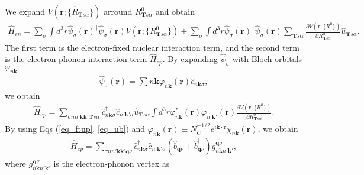 \documentclass{article}
\begin{document}
We expand $V(\textbf{r};\{\hat{R}_{\textbf{T}s\alpha}\})$ arround $R^0_{\textbf{T}s\alpha}$
and obtain
\begin{align}
    \hat{H}_{en} = \sum_{\sigma} \int d^3 r \hat{\psi}_{\sigma}(\textbf{r})^\dagger 
    \hat{\psi}_{\sigma}(\textbf{r}) V(\textbf{r};\{R^0_{\textbf{T}s\alpha}\})
    +
    \sum_{\sigma} \int d^3 r \hat{\psi}_{\sigma}(\textbf{r})^\dagger 
    \hat{\psi}_{\sigma}(\textbf{r}) \sum_{\textbf{T}s\alpha} 
    \frac{\partial V(\textbf{r};\{R^0\})}{\partial R^0_{\textbf{T}s\alpha}}
    \hat{u}_{\textbf{T}s\alpha}.
\end{align}
The first term is the electron-fixed nuclear interaction term, and the second term is the electron-phonon interaction term $\hat{H}_{ep}$.
By expanding $\hat{\psi}_{\sigma}$ with Bloch orbitals $\varphi_{n\textbf{k}}$
\begin{align}
    \hat{\psi}_{\sigma}(\textbf{r}) = \sum{n\textbf{k}}\varphi_{n\textbf{k}}(\textbf{r})
    \hat{c}_{n\textbf{k}\sigma},
\end{align}
we obtain
\begin{align}
    \hat{H}_{ep} = \sum_{\sigma n n' \textbf{k} \textbf{k}' \textbf{T}s\alpha}
    \hat{c}_{n\textbf{k}\sigma}^\dagger \hat{c}_{n'\textbf{k}'\sigma}
    \hat{u}_{\textbf{T}s\alpha}
    \int d^3 r \varphi_{n\textbf{k}}^*(\textbf{r})\varphi_{n'\textbf{k}'}(\textbf{r})
    \frac{\partial V(\textbf{r};\{R^0\})}{\partial R^0_{\textbf{T}s\alpha}}.
\end{align}
By using Eqs (\ref{eq_ftup}, \ref{eq_ub}) and 
$\varphi_{n\textbf{k}}(\textbf{r}) \equiv N^{-1/2}_C e^{i \textbf{k} \cdot \textbf{r}} 
\chi_{n\textbf{k}}(\textbf{r})$, we obtain
\begin{align}
    \hat{H}_{ep} = \sum_{\sigma n n' \textbf{k} \textbf{k}' \textbf{q} \nu}
    \hat{c}_{n\textbf{k}\sigma}^\dagger \hat{c}_{n'\textbf{k}'\sigma}
    (\hat{b}_{\textbf{q}\nu} + \hat{b}_{\textbf{q}\nu}^\dagger)
    g_{n\textbf{k} n'\textbf{k}'}^{\textbf{q}\nu},
\end{align}
where $g_{n\textbf{k} n'\textbf{k}'}^{\textbf{q}\nu}$ is the electron-phonon vertex as
\end{document}

